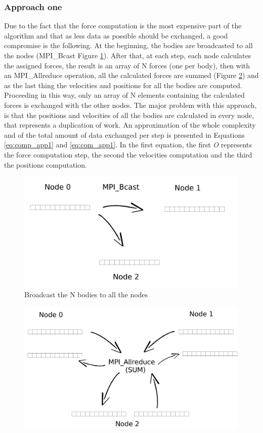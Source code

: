 \documentclass[a4paper]{article}
\begin{document}
\subsubsection{Approach one}
\label{sec:app_1}
Due to the fact that the force computation is the most expensive part of the algorithm and that as less data as possible should be exchanged, a good compromise is the following. At the beginning, the bodies are broadcasted to all the nodes (MPI\_Bcast Figure \ref{fig:A2}). After that, at each step, each node calculates the assigned forces, the result is an array of N forces (one per body), then with an MPI\_Allreduce operation, all the calculated forces are summed (Figure \ref{fig:C2}) and as the last thing the velocities and positions for all the bodies are computed. Proceeding in this way, only an array of N elements containing the calculated forces is exchanged with the other nodes. The major problem with this approach, is that the positions and velocities of all the bodies are calculated in every node, that represents a duplication of work. An approximation of the whole complexity and of the total amount of data exchanged per step is presented in Equations \ref{eq:comp_app1} and \ref{eq:com_app1}. In the first equation, the first \textit{O} represents the force computation step, the second the velocities computation and the third the positions computation.

\begin{figure}[ht]
  \centering
  \includegraphics[width=0.5\linewidth]{broadcast2}
  \caption{Broadcast the N bodies to all the nodes}
  \label{fig:A2}
\end{figure}
\FloatBarrier


\begin{figure}[ht]
  \includegraphics[width=0.5\linewidth]{MPI_all_reduce}
  \label{fig:C2}
\end{figure}
\FloatBarrier
\end{document}
